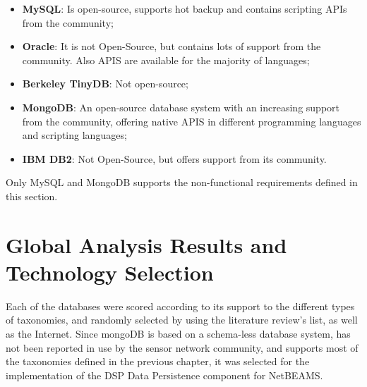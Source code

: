 \begin{itemize}
  \item \textbf{MySQL}: Is  open-source, supports hot backup and contains
  scripting APIs from  the community;
  \item \textbf{Oracle}: It is not Open-Source, but contains lots of support
  from the community. Also APIS are available for the majority of languages;
  \item \textbf{Berkeley TinyDB}: Not open-source;
  \item \textbf{MongoDB}: An open-source database system with an increasing
  support from  the community, offering native APIS in different programming
  languages and scripting languages;
  \item \textbf{IBM DB2}: Not Open-Source, but offers support from its
  community.
\end{itemize}

Only MySQL and MongoDB supports the non-functional requirements defined in this
section.

\section{Global Analysis Results and Technology Selection}

Each of the databases were scored according to its support to the different
types of taxonomies, and randomly selected by using the literature review's
list, as well as the Internet. Since mongoDB is based on a schema-less database
system, has not been reported in use by the sensor network community, and
supports most of the taxonomies defined in the previous chapter, it was
selected for the implementation of the DSP Data Persistence component for
NetBEAMS.

